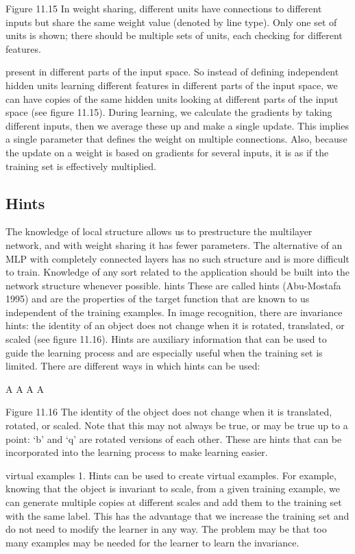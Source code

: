 Figure 11.15 In weight sharing, different units have connections to different inputs but share the same weight value (denoted by line type). Only one set of units is shown; there should be multiple sets of units, each checking for different features.

present in different parts of the input space. So instead of defining independent hidden units learning different features in different parts of the input space, we can have copies of the same hidden units looking at different parts of the input space (see figure 11.15). During learning, we calculate the gradients by taking different inputs, then we average these up and make a single update. This implies a single parameter that defines the weight on multiple connections. Also, because the update on a weight is based on gradients for several inputs, it is as if the training set is effectively multiplied.

\subsection{Hints}

The knowledge of local structure allows us to prestructure the multilayer network, and with weight sharing it has fewer parameters. The alternative of an MLP with completely connected layers has no such structure and is more difficult to train. Knowledge of any sort related to the application should be built into the network structure whenever possible. hints These are called hints (Abu-Mostafa 1995) and are the properties of the target function that are known to us independent of the training examples. In image recognition, there are invariance hints: the identity of an object does not change when it is rotated, translated, or scaled (see figure 11.16). Hints are auxiliary information that can be used to guide the learning process and are especially useful when the training set is limited. There are different ways in which hints can be used:

A A A A

Figure 11.16 The identity of the object does not change when it is translated, rotated, or scaled. Note that this may not always be true, or may be true up to a point: ‘b’ and ‘q’ are rotated versions of each other. These are hints that can be incorporated into the learning process to make learning easier.

virtual examples 1. Hints can be used to create virtual examples. For example, knowing that the object is invariant to scale, from a given training example, we can generate multiple copies at different scales and add them to the training set with the same label. This has the advantage that we increase the training set and do not need to modify the learner in any way. The problem may be that too many examples may be needed for the learner to learn the invariance.

